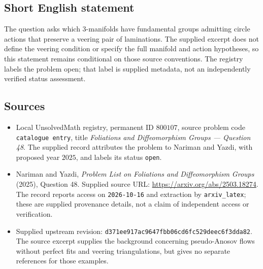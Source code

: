 \documentclass[11pt]{article}
\begin{document}
\subsection{Short English statement}
The question asks which \(3\)-manifolds have fundamental groups admitting circle actions that preserve a veering pair of laminations. The supplied excerpt does not define the veering condition or specify the full manifold and action hypotheses, so this statement remains conditional on those source conventions. The registry labels the problem open; that label is supplied metadata, not an independently verified status assessment.
\subsection{Sources}
\begin{itemize}
\item Local UnsolvedMath registry, permanent ID \(800107\), source problem code \texttt{catalogue entry}, title \emph{Foliations and Diffeomorphism Groups --- Question 48}. The supplied record attributes the problem to Nariman and Yazdi, with proposed year \(2025\), and labels its status \texttt{open}.
\item Nariman and Yazdi, \emph{Problem List on Foliations and Diffeomorphism Groups} (2025), Question 48. Supplied source URL: \url{https://arxiv.org/abs/2503.18274}. The record reports access on \texttt{2026-10-16} and extraction by \texttt{arxiv\_latex}; these are supplied provenance details, not a claim of independent access or verification.
\item Supplied upstream revision: \texttt{d371ee917ac9647fbb06cd6fc529deec6f3dda82}. The source excerpt supplies the background concerning pseudo-Anosov flows without perfect fits and veering triangulations, but gives no separate references for those examples.
\end{itemize}
\end{document}

